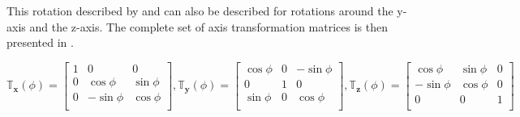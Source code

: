 This rotation described by  and  can also be described for rotations around the y-axis and the z-axis. The complete set of axis transformation matrices is then presented in .

\begin{equation} \label{eq:alltransmatr}
\mathbb{T}_{\mathbf{x}}(\phi)=\begin{bmatrix}
1 & 0 & 0 \\
0 & \cos\phi & \sin\phi \\
0 & -\sin\phi & \cos\phi \\
\end{bmatrix}, 
\mathbb{T}_{\mathbf{y}}(\phi)=\begin{bmatrix}
\cos\phi & 0 & -\sin\phi \\
0 & 1 & 0\\
\sin\phi & 0 & \cos\phi \\
\end{bmatrix}, 
\mathbb{T}_{\mathbf{z}}(\phi)=\begin{bmatrix}
\cos\phi & \sin\phi & 0\\
- \sin\phi & \cos\phi & 0\\
0 & 0 & 1\\
\end{bmatrix}
\end{equation}

